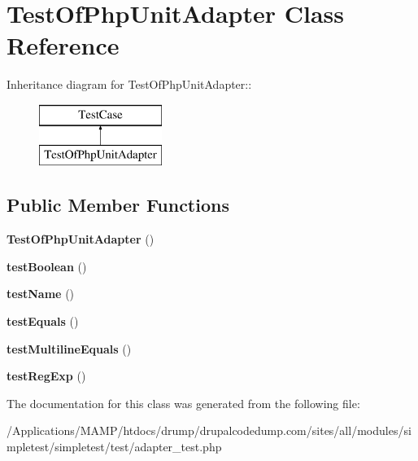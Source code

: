 \hypertarget{class_test_of_php_unit_adapter}{
\section{TestOfPhpUnitAdapter Class Reference}
\label{class_test_of_php_unit_adapter}
}
Inheritance diagram for TestOfPhpUnitAdapter::\begin{figure}[H]
\begin{center}
\leavevmode
\includegraphics[height=2cm]{class_test_of_php_unit_adapter}
\end{center}
\end{figure}
\subsection*{Public Member Functions}
\begin{DoxyCompactItemize}
\item 
\hypertarget{class_test_of_php_unit_adapter_af42071006da5f3c802b019a792f3e005}{
{\bfseries TestOfPhpUnitAdapter} ()}
\label{class_test_of_php_unit_adapter_af42071006da5f3c802b019a792f3e005}

\item 
\hypertarget{class_test_of_php_unit_adapter_aa19aea3e951d287d09272046fb229050}{
{\bfseries testBoolean} ()}
\label{class_test_of_php_unit_adapter_aa19aea3e951d287d09272046fb229050}

\item 
\hypertarget{class_test_of_php_unit_adapter_a89c265878c24f3a0794d95aac66c3c74}{
{\bfseries testName} ()}
\label{class_test_of_php_unit_adapter_a89c265878c24f3a0794d95aac66c3c74}

\item 
\hypertarget{class_test_of_php_unit_adapter_a370cea05a448972d8a596e556008b690}{
{\bfseries testEquals} ()}
\label{class_test_of_php_unit_adapter_a370cea05a448972d8a596e556008b690}

\item 
\hypertarget{class_test_of_php_unit_adapter_aa8ce9c6650ae795bcc8ef3bcf7f4d3e8}{
{\bfseries testMultilineEquals} ()}
\label{class_test_of_php_unit_adapter_aa8ce9c6650ae795bcc8ef3bcf7f4d3e8}

\item 
\hypertarget{class_test_of_php_unit_adapter_a14c89836056a63ef13500eb680014458}{
{\bfseries testRegExp} ()}
\label{class_test_of_php_unit_adapter_a14c89836056a63ef13500eb680014458}

\end{DoxyCompactItemize}


The documentation for this class was generated from the following file:\begin{DoxyCompactItemize}
\item 
/Applications/MAMP/htdocs/drump/drupalcodedump.com/sites/all/modules/simpletest/simpletest/test/adapter\_\-test.php\end{DoxyCompactItemize}

